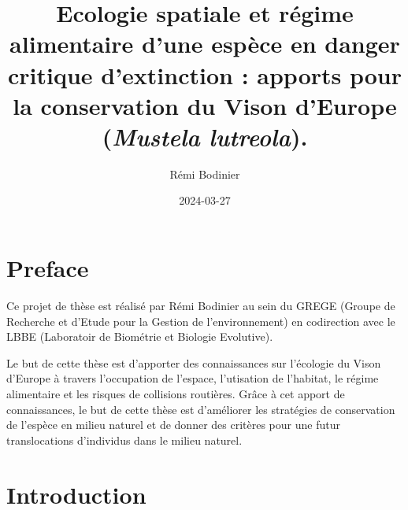 \documentclass[
  letterpaper,
  DIV=11,
  numbers=noendperiod]{scrreprt}
\title{Ecologie spatiale et régime alimentaire d'une espèce en danger
critique d'extinction : apports pour la conservation du Vison d'Europe
(\emph{Mustela lutreola}).}
\author{Rémi Bodinier}
\date{2024-03-27}
\renewcommand*\contentsname{Table of contents}
\newcommand\contentsname{Table of contents}
\begin{document}
\maketitle

\renewcommand*\contentsname{Table of contents}
{
\hypersetup{linkcolor=}
\setcounter{tocdepth}{2}
\tableofcontents
}

\chapter*{Preface}\label{preface}


Ce projet de thèse est réalisé par Rémi Bodinier au sein du GREGE
(Groupe de Recherche et d'Etude pour la Gestion de l'environnement) en
codirection avec le LBBE (Laboratoir de Biométrie et Biologie
Evolutive).

Le but de cette thèse est d'apporter des connaissances sur l'écologie du
Vison d'Europe à travers l'occupation de l'espace, l'utisation de
l'habitat, le régime alimentaire et les risques de collisions routières.
Grâce à cet apport de connaissances, le but de cette thèse est
d'améliorer les stratégies de conservation de l'espèce en milieu naturel
et de donner des critères pour une futur translocations d'individus dans
le milieu naturel.


\chapter{Introduction}\label{introduction}
\end{document}
